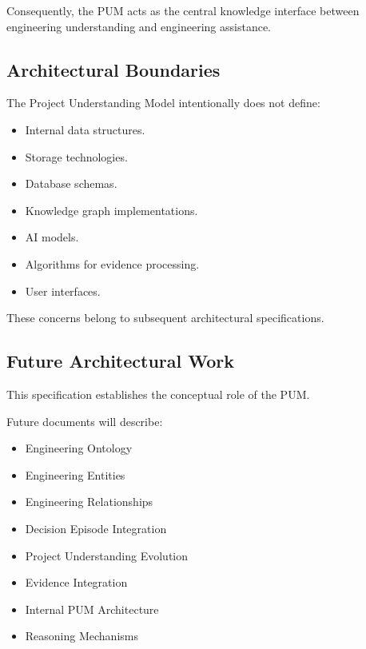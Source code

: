 Consequently, the PUM acts as the central knowledge interface between engineering understanding and engineering assistance.


\subsection{Architectural Boundaries}

The Project Understanding Model intentionally does not define:

\begin{itemize}

\item Internal data structures.

\item Storage technologies.

\item Database schemas.

\item Knowledge graph implementations.

\item AI models.

\item Algorithms for evidence processing.

\item User interfaces.

\end{itemize}

These concerns belong to subsequent architectural specifications.


\subsection{Future Architectural Work}

This specification establishes the conceptual role of the PUM.

Future documents will describe:

\begin{itemize}

\item Engineering Ontology

\item Engineering Entities

\item Engineering Relationships

\item Decision Episode Integration

\item Project Understanding Evolution

\item Evidence Integration

\item Internal PUM Architecture

\item Reasoning Mechanisms

\end{itemize}

